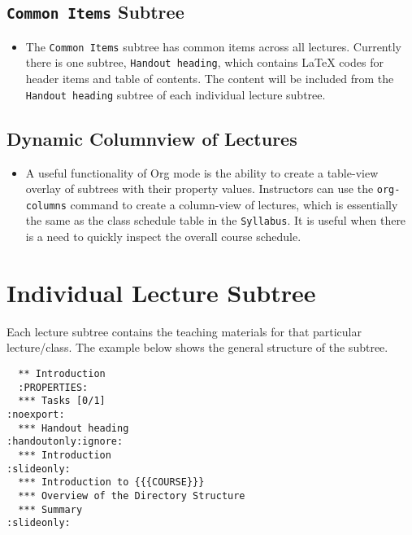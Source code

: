 \documentclass[10pt,article]{article}
\begin{document}
\subsection{\texttt{Common Items} Subtree}
\label{sec:org2f2a6c4}
\begin{itemize}
\item The \texttt{Common Items} subtree has common items across all lectures. Currently
there is one subtree, \texttt{Handout heading}, which contains \LaTeX{} codes for
header items and table of contents. The content will be included from the 
\texttt{Handout heading} subtree of each individual lecture subtree.
\end{itemize}
\subsection{Dynamic Columnview of Lectures}
\label{sec:org8adcc75}
\begin{itemize}
\item A useful functionality of Org mode is the ability to create a
table-view overlay of subtrees with their property
values. Instructors can use the \texttt{org-columns} command to create a column-view of
lectures, which is essentially the same as the class schedule table
in the \texttt{Syllabus}. It is useful when there is a need to quickly inspect
the overall course schedule.
\end{itemize}
\section{Individual Lecture Subtree}
\label{sec:org04f79ed}
Each lecture subtree contains the teaching materials for that particular lecture/class. The
example below shows the general structure of the subtree.

\begin{verbatim}
  ** Introduction
  :PROPERTIES:
  *** Tasks [0/1]                                                  :noexport:
  *** Handout heading                                    :handoutonly:ignore:
  *** Introduction                                                :slideonly:
  *** Introduction to {{{COURSE}}}
  *** Overview of the Directory Structure
  *** Summary                                                     :slideonly:
\end{verbatim}
\end{document}

